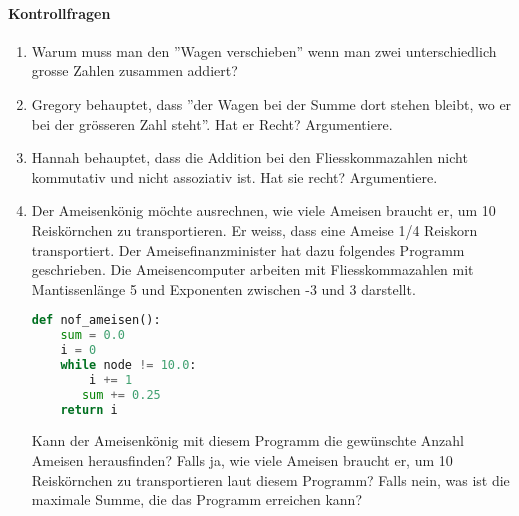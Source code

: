 \paragraph{Kontrollfragen}
\begin{enumerate}
\item Warum muss man den ''Wagen verschieben'' wenn man zwei unterschiedlich grosse Zahlen zusammen addiert?
\item Gregory behauptet, dass ''der Wagen bei der Summe dort stehen bleibt, wo er bei der grösseren Zahl steht''. Hat er Recht? Argumentiere.
\item Hannah behauptet, dass die Addition bei den Fliesskommazahlen nicht kommutativ und nicht assoziativ ist. Hat sie recht? Argumentiere. 
\item Der Ameisenkönig möchte ausrechnen, wie viele Ameisen braucht er, um 10 Reiskörnchen zu transportieren. Er weiss, dass eine Ameise 1/4 Reiskorn transportiert. Der Ameisefinanzminister hat dazu folgendes Programm geschrieben. Die Ameisencomputer arbeiten mit Fliesskommazahlen mit Mantissenlänge 5 und Exponenten zwischen -3 und 3 darstellt.
\begin{lstlisting}[language=Python, caption={Programm vom Ameisenfinanzminister}]
def nof_ameisen():
    sum = 0.0
    i = 0
    while node != 10.0:
    	i += 1
       sum += 0.25
    return i
\end{lstlisting}
Kann der Ameisenkönig mit diesem Programm die gewünschte Anzahl Ameisen herausfinden? Falls ja, wie viele Ameisen braucht er, um 10 Reiskörnchen zu transportieren laut diesem Programm? Falls nein, was ist die maximale Summe, die das Programm erreichen kann?
\end{enumerate}